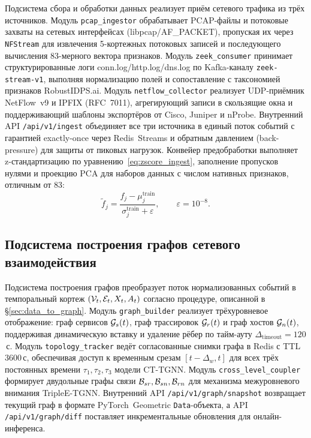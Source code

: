 Подсистема сбора и обработки данных реализует приём сетевого трафика из трёх источников. Модуль \texttt{pcap\_ingestor} обрабатывает PCAP-файлы и потоковые захваты на сетевых интерфейсах (libpcap/AF\_PACKET), пропуская их через \texttt{NFStream} для извлечения 5-кортежных потоковых записей и последующего вычисления 83-мерного вектора признаков. Модуль \texttt{zeek\_consumer} принимает структурированные логи conn.log/http.log/dns.log по Kafka-каналу \texttt{zeek-stream-v1}, выполняя нормализацию полей и сопоставление с таксономией признаков RobustIDPS.ai. Модуль \texttt{netflow\_collector} реализует UDP-приёмник NetFlow~v9 и IPFIX (RFC~7011), агрегирующий записи в скользящие окна и поддерживающий шаблоны экспортёров от Cisco, Juniper и nProbe. Внутренний API \texttt{/api/v1/ingest} объединяет все три источника в единый поток событий с гарантией exactly-once через Redis~Streams и обратным давлением (back-pressure) для защиты от пиковых нагрузок. Конвейер предобработки выполняет z-стандартизацию по уравнению~\eqref{eq:zscore_ingest}, заполнение пропусков нулями и проекцию PCA для наборов данных с числом нативных признаков, отличным от 83:
\begin{equation}
\tilde{f}_j = \frac{f_j - \mu_j^{\mathrm{train}}}{\sigma_j^{\mathrm{train}} + \varepsilon}, \qquad \varepsilon=10^{-8}.
\label{eq:zscore_ingest}
\end{equation}

\subsection{Подсистема построения графов сетевого взаимодействия}
\label{subsec:func_graph}

Подсистема построения графов преобразует поток нормализованных событий в темпоральный кортеж $(\mathcal{V}_t,\mathcal{E}_t,X_t,A_t)$ согласно процедуре, описанной в \S\ref{sec:data_to_graph}. Модуль \texttt{graph\_builder} реализует трёхуровневое отображение: граф сервисов $\mathcal{G}_s(t)$, граф трассировок $\mathcal{G}_r(t)$ и граф хостов $\mathcal{G}_n(t)$, поддерживая динамическую вставку и удаление рёбер по тайм-ауту $\Delta_{\mathrm{timeout}}=120$\,с. Модуль \texttt{topology\_tracker} ведёт согласованные снимки графа в Redis с TTL 3600\,с, обеспечивая доступ к временным срезам $[t-\Delta_w,t]$ для всех трёх постоянных времени $\tau_1,\tau_2,\tau_3$ модели CT-TGNN. Модуль \texttt{cross\_level\_coupler} формирует двудольные графы связи $\mathcal{B}_{sr},\mathcal{B}_{sn},\mathcal{B}_{rn}$ для механизма межуровневого внимания TripleE-TGNN. Внутренний API \texttt{/api/v1/graph/snapshot} возвращает текущий граф в формате PyTorch~Geometric \texttt{Data}-объекта, а API \texttt{/api/v1/graph/diff} поставляет инкрементальные обновления для онлайн-инференса.


